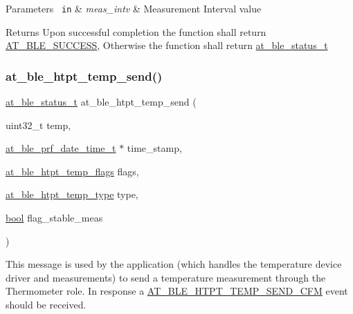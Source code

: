 \begin{DoxyParams}[1]{Parameters}
\mbox{\texttt{ in}}  & {\em meas\+\_\+intv} & Measurement Interval value\\
\hline
\end{DoxyParams}
\begin{DoxyReturn}{Returns}
Upon successful completion the function shall return \mbox{\hyperlink{group__error__codes__group_gga3b1db9b95feb157b3c188ca27fe76988a7e3bfff5387331cd4f2c56cbcbbd7e19}{A\+T\+\_\+\+B\+L\+E\+\_\+\+S\+U\+C\+C\+E\+SS}}, Otherwise the function shall return \mbox{\hyperlink{at__ble__api_8h_ace24eb4e5ca3f325c663b809da5feb92}{at\+\_\+ble\+\_\+status\+\_\+t}} 
\end{DoxyReturn}
\mbox{\label{group__htpt__group_ga4979577ecfab6b25dc76e2a448c65b37}} 
\subsubsection{\texorpdfstring{at\_ble\_htpt\_temp\_send()}{at\_ble\_htpt\_temp\_send()}}
{\footnotesize\ttfamily \mbox{\hyperlink{group__error__codes__group_ga3b1db9b95feb157b3c188ca27fe76988}{at\+\_\+ble\+\_\+status\+\_\+t}} at\+\_\+ble\+\_\+htpt\+\_\+temp\+\_\+send (\begin{DoxyParamCaption}\item[{uint32\+\_\+t}]{temp,  }\item[{\mbox{\hyperlink{structat__ble__prf__date__time__t}{at\+\_\+ble\+\_\+prf\+\_\+date\+\_\+time\+\_\+t}} $\ast$}]{time\+\_\+stamp,  }\item[{\mbox{\hyperlink{at__ble__api_8h_accb2a3740dd79da6ab168adfa69c9548}{at\+\_\+ble\+\_\+htpt\+\_\+temp\+\_\+flags}}}]{flags,  }\item[{\mbox{\hyperlink{at__ble__api_8h_a236445568b928ababcce95965c981348}{at\+\_\+ble\+\_\+htpt\+\_\+temp\+\_\+type}}}]{type,  }\item[{\mbox{\hyperlink{group__group__sam0__utils_ga97a80ca1602ebf2303258971a2c938e2}{bool}}}]{flag\+\_\+stable\+\_\+meas }\end{DoxyParamCaption})}



This message is used by the application (which handles the temperature device driver and measurements) to send a temperature measurement through the Thermometer role. In response a \mbox{\hyperlink{at__ble__api_8h_a3324640b95f33169515f89738ed5baeba918f0b91ca899278bb08d41cf98cb005}{A\+T\+\_\+\+B\+L\+E\+\_\+\+H\+T\+P\+T\+\_\+\+T\+E\+M\+P\+\_\+\+S\+E\+N\+D\+\_\+\+C\+FM}} event should be received. 


